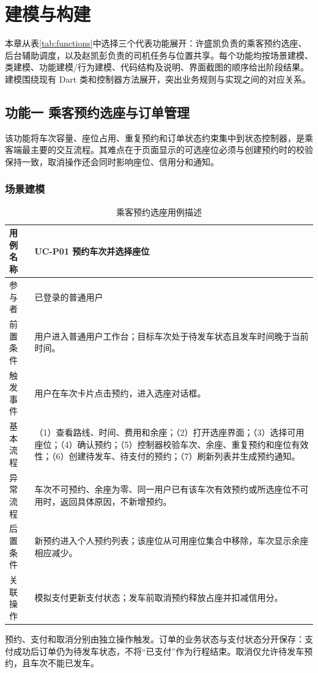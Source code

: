 \section{建模与构建}
本章从表\ref{tab:functions}中选择三个代表功能展开：许盛凯负责的乘客预约选座、后台辅助调度，以及赵凯彭负责的司机任务与位置共享。每个功能均按场景建模、类建模、功能建模/行为建模、代码结构及说明、界面截图的顺序给出阶段结果。建模围绕现有 Dart 类和控制器方法展开，突出业务规则与实现之间的对应关系。

\subsection{功能一 乘客预约选座与订单管理}
该功能将车次容量、座位占用、重复预约和订单状态约束集中到状态控制器，是乘客端最主要的交互流程。其难点在于页面显示的可选座位必须与创建预约时的校验保持一致，取消操作还会同时影响座位、信用分和通知。

\subsubsection{场景建模}
\begin{table}[H]\centering\small
\caption{乘客预约选座用例描述}
\begin{tabularx}{\linewidth}{|P{2cm}|Y|}\hline
用例名称 & UC-P01 预约车次并选择座位\\\hline
参与者 & 已登录的普通用户\\\hline
前置条件 & 用户进入普通用户工作台；目标车次处于待发车状态且发车时间晚于当前时间。\\\hline
触发事件 & 用户在车次卡片点击预约，进入选座对话框。\\\hline
基本流程 & （1）查看路线、时间、费用和余座；（2）打开选座界面；（3）选择可用座位；（4）确认预约；（5）控制器校验车次、余座、重复预约和座位有效性；（6）创建待发车、待支付的预约；（7）刷新列表并生成预约通知。\\\hline
异常流程 & 车次不可预约、余座为零、同一用户已有该车次有效预约或所选座位不可用时，返回具体原因，不新增预约。\\\hline
后置条件 & 新预约进入个人预约列表；该座位从可用座位集合中移除，车次显示余座相应减少。\\\hline
关联操作 & 模拟支付更新支付状态；发车前取消预约释放占座并扣减信用分。\\\hline
\end{tabularx}\end{table}
预约、支付和取消分别由独立操作触发。订单的业务状态与支付状态分开保存：支付成功后订单仍为待发车状态，不将“已支付”作为行程结束。取消仅允许待发车预约，且车次不能已发车。


